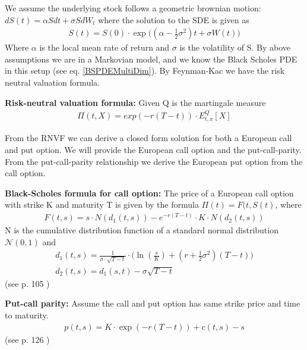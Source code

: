 We assume the underlying stock follows a geometric brownian motion:
$dS(t)=\alpha S dt + \sigma S dW_t$ where the solution to the SDE is given as
\begin{equation}\label{GBM}
\begin{split}
S(t)=S(0) \cdot \exp \bigg( (\alpha -\frac{1}{2} \sigma^2) t + \sigma W(t) \bigg)
\end{split}
\end{equation}
Where $\alpha$ is the local mean rate of return and $\sigma$ is the volatility of S. By above assumptions we are in a Markovian model, and we know the Black Scholes PDE in this setup (see eq.  \ref{BSPDEMultiDim}). By Feynman-Kac we have the risk neutral valuation formula.

\begin{theorem}\label{BRNVF}
\textbf{Risk-neutral valuation formula:} Given Q is the martingale measure
\begin{align}
\Pi(t, X)= exp(-r(T-t))\cdot E_{t,x}^Q[X]
\end{align}
\end{theorem}
From the RNVF we can derive a closed form solution for both a European call and put option. We will provide the European call option and the put-call-parity. From the put-call-parity relationship we derive the European put option from the call option.

\theoremstyle{proposition}
\begin{proposition}{}\label{BS-price-EuroCall}
\textbf{Black-Scholes formula for call option:} The price of a European call option with strike K and maturity T is given by the formula  $\Pi(t)=F(t,S(t)$, where
\begin{align*}
F(t,s)=s \cdot N(d_1(t,s)) - e^{-r(T-t)}\cdot K \cdot N(d_2(t,s))
\end{align*}
N is the cumulative distribution function of a standard normal distribution $\mathcal{N}(0,1)$ and
\begin{align*}
d_1(t,s)=\frac{1}{\sigma\cdot \sqrt{T-t}} \cdot \bigg( \ln(\frac{s}{K}) + (r+\frac{1}{2} \sigma^2) (T-t) \bigg)\\
d_2(t,s)=d_1(s,t)-\sigma \sqrt{T-t}
\end{align*}
(see p. 105 \parencite{finKont})
\end{proposition}

\theoremstyle{proposition}
\begin{proposition}{}\label{put-call-parity}
\textbf{Put-call parity:} 
Assume the call and put option has same strike price and time to maturity.
\begin{align*}
p(t,s)=K\cdot \exp(-r(T-t))+c(t,s)-s
\end{align*}
(see p. 126 \parencite{finKont})
\end{proposition}

